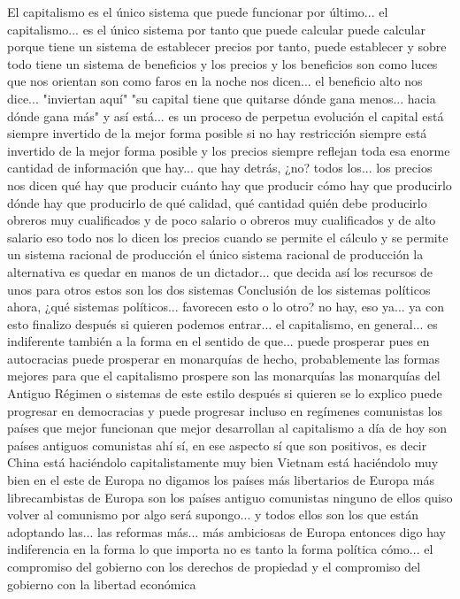 El capitalismo es el único sistema que puede funcionar
por último... el capitalismo... es el único sistema por tanto que puede calcular
puede calcular porque tiene un sistema de establecer precios por tanto, puede establecer y sobre todo tiene un sistema de beneficios
y los precios y los beneficios son como luces que nos orientan son como faros en la noche
nos dicen... el beneficio alto nos dice... "inviertan aquí" "su capital tiene que quitarse dónde gana menos...
hacia dónde gana más" y así está... es un proceso de perpetua evolución el capital está siempre invertido de la mejor forma posible
si no hay restricción siempre está invertido de la mejor forma posible y los precios siempre reflejan
toda esa enorme cantidad de información que hay... que hay detrás, ¿no? todos los...
los precios nos dicen qué hay que producir cuánto hay que producir cómo hay que producirlo
dónde hay que producirlo de qué calidad, qué cantidad quién debe producirlo obreros muy cualificados y de poco salario
o obreros muy cualificados y de alto salario eso todo nos lo dicen los precios cuando se permite el cálculo y se permite un sistema racional de producción
el único sistema racional de producción la alternativa es quedar en manos de un dictador...
que decida así los recursos de unos para otros estos son los dos sistemas
Conclusión de los sistemas políticos
ahora, ¿qué sistemas políticos... favorecen esto o lo otro? no hay, eso ya... ya con esto finalizo
después si quieren podemos entrar... el capitalismo, en general...
es indiferente también a la forma en el sentido de que... puede prosperar pues en autocracias
puede prosperar en monarquías de hecho, probablemente las formas mejores
para que el capitalismo prospere son las monarquías las monarquías del Antiguo Régimen o sistemas de este estilo
después si quieren se lo explico puede progresar en democracias y puede progresar incluso en regímenes comunistas los países que mejor funcionan
que mejor desarrollan al capitalismo a día de hoy son países antiguos comunistas ahí sí, en ese aspecto
sí que son positivos, es decir China está haciéndolo capitalistamente muy bien Vietnam está haciéndolo muy bien
en el este de Europa no digamos los países más libertarios de Europa más librecambistas de Europa son los países antiguo comunistas
ninguno de ellos quiso volver al comunismo por algo será supongo... y todos ellos son los que están adoptando las... las reformas más...
más ambiciosas de Europa entonces digo hay indiferencia en la forma lo que importa no es tanto la forma política cómo...
el compromiso del gobierno con los derechos de propiedad y el compromiso del gobierno con la libertad económica
